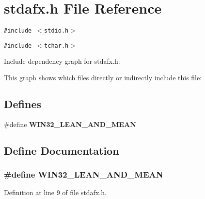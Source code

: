 \section{stdafx.h File Reference}
\label{stdafx_8h}


{\tt \#include $<$stdio.h$>$}\par
{\tt \#include $<$tchar.h$>$}\par


Include dependency graph for stdafx.h:

This graph shows which files directly or indirectly include this file:\subsection*{Defines}
\begin{CompactItemize}
\item 
\#define {\bf WIN32\_\-LEAN\_\-AND\_\-MEAN}
\end{CompactItemize}


\subsection{Define Documentation}
\subsubsection{\setlength{\rightskip}{0pt plus 5cm}\#define WIN32\_\-LEAN\_\-AND\_\-MEAN}\label{stdafx_8h_c7bef5d85e3dcd73eef56ad39ffc84a9}




Definition at line 9 of file stdafx.h.